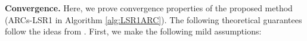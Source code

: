 %

\medskip

\noindent \textbf{Convergence.} 
Here, we prove convergence properties of the proposed method (ARCs-LSR1 in Algorithm \ref{alg:LSR1ARC}).
The following theoretical guarantees follow the ideas from \citet{Benson2018,cartis2011adaptive}.
First, we make the following mild assumptions:


